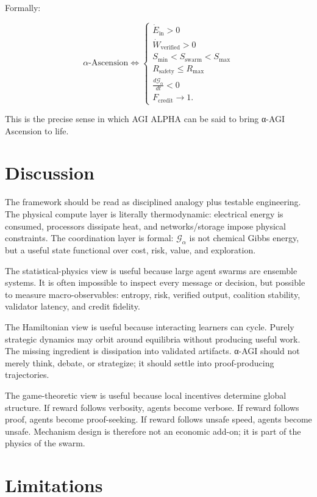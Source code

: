 \documentclass[11pt]{article}
\begin{document}
Formally:

\[
\alpha\text{-Ascension}
\iff
\begin{cases}
\dot{E}_{\text{in}}>0 \\
\dot{W}_{\text{verified}}>0 \\
S_{\min}<S_{\text{swarm}}<S_{\max} \\
R_{\text{safety}}\leq R_{\max} \\
\frac{d\mathcal{G}_{\alpha}}{dt}<0 \\
F_{\text{credit}}\rightarrow 1.
\end{cases}
\]

This is the precise sense in which AGI ALPHA can be said to bring α-AGI
Ascension to life.

\section{Discussion}\label{discussion}

The framework should be read as disciplined analogy plus testable
engineering. The physical compute layer is literally thermodynamic:
electrical energy is consumed, processors dissipate heat, and
networks/storage impose physical constraints. The coordination layer is
formal: \(\mathcal{G}_{\alpha}\) is not chemical Gibbs energy, but a
useful state functional over cost, risk, value, and exploration.

The statistical-physics view is useful because large agent swarms are
ensemble systems. It is often impossible to inspect every message or
decision, but possible to measure macro-observables: entropy, risk,
verified output, coalition stability, validator latency, and credit
fidelity.

The Hamiltonian view is useful because interacting learners can cycle.
Purely strategic dynamics may orbit around equilibria without producing
useful work. The missing ingredient is dissipation into validated
artifacts. α-AGI should not merely think, debate, or strategize; it
should settle into proof-producing trajectories.

The game-theoretic view is useful because local incentives determine
global structure. If reward follows verbosity, agents become verbose. If
reward follows proof, agents become proof-seeking. If reward follows
unsafe speed, agents become unsafe. Mechanism design is therefore not an
economic add-on; it is part of the physics of the swarm.

\section{Limitations}\label{limitations}
\end{document}
